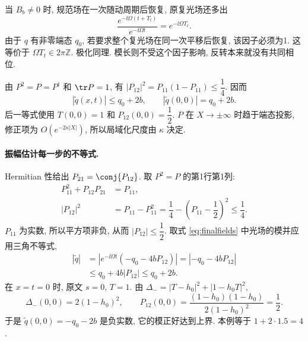 当 $B_b\ne0$ 时, 规范场在一次随动周期后恢复, 原复光场还多出
\[
\dfrac{e^{-\ii\Omega(t+T_t)}}{e^{-\ii\Omega t}}
=e^{-\ii\Omega T_t}.
\]
由于 $q$ 有非零端态 $q_0$, 若要求整个复光场在同一次平移后恢复, 该因子必须为1. 这等价于 $\Omega T_t\in2\pi\mathbb Z$. 极化同理. 模长则不受这个因子影响, 反转本来就没有共同相位.

由 $P^2=P=P^\dagger$ 和 $\tr P=1$, 有 $|P_{12}|^2=P_{11}(1-P_{11})\le\dfrac{1}{4}$. 因而
\begin{equation}\label{eq:amplitude-bound}
|\widetilde q(x,t)|\le q_0+2b,\qquad |\widetilde q(0,0)|=q_0+2b.
\end{equation}
后一等式使用 $T(0,0)=1$ 和 $P_{12}(0,0)=\dfrac{1}{2}$. $P$ 在 $X\to\pm\infty$ 时趋于端态投影, 修正项为 $O(e^{-2\kappa|X|})$, 所以局域化尺度由 $\kappa$ 决定.

\paragraph{振幅估计每一步的不等式.}
Hermitian 性给出 $P_{21}=\conj{P_{12}}$. 取 $P^2=P$ 的第1行第1列:
\begin{align*}
P_{11}^2+P_{12}P_{21}&=P_{11},\\
|P_{12}|^2&=P_{11}-P_{11}^2
=\dfrac{1}{4}-\left(P_{11}-\dfrac{1}{2}\right)^2\le\dfrac{1}{4}.
\end{align*}
$P_{11}$ 为实数, 所以平方项非负, 从而 $|P_{12}|\le\dfrac{1}{2}$. 取式 \eqref{eq:finalfields} 中光场的模并应用三角不等式,
\begin{align*}
|\widetilde q|
&=\left|e^{-\ii\Omega t}(-q_0-4bP_{12})\right|
=|-q_0-4bP_{12}|\\
&\le q_0+4b|P_{12}|
\le q_0+2b.
\end{align*}
在 $x=t=0$ 时, 原文 $s=0$, $T=1$. 由 $\Delta_-=|T-h_0|^2+|1-h_0T|^2$,
\[
\Delta_-(0,0)=2(1-h_0)^2,
\qquad
P_{12}(0,0)=\dfrac{(1-h_0)(1-h_0)}{2(1-h_0)^2}=\dfrac{1}{2}.
\]
于是 $\widetilde q(0,0)=-q_0-2b$ 是负实数, 它的模正好达到上界. 本例等于 $1+2\cdot1.5=4$.

